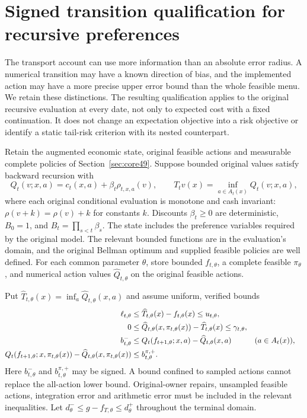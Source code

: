 \section{Signed transition qualification for recursive preferences}\label{sec:risk91}
The transport account can use more information than an absolute error radius. A numerical transition may have a known direction of bias, and the implemented action may have a more precise upper error bound than the whole feasible menu. We retain these distinctions. The resulting qualification applies to the original recursive evaluation at every date, not only to expected cost with a fixed continuation. It does not change an expectation objective into a risk objective or identify a static tail-risk criterion with its nested counterpart.

Retain the augmented economic state, original feasible actions and measurable complete policies of Section~\ref{sec:core49}. Suppose bounded original values satisfy backward recursion with
\[
 Q_t(v;x,a)=c_t(x,a)+\beta_t\rho_{t,x,a}(v),\qquad
 T_tv(x)=\inf_{a\in A_t(x)}Q_t(v;x,a),
\]
where each original conditional evaluation is monotone and cash invariant: $\rho(v+k)=\rho(v)+k$ for constants $k$. Discounts $\beta_t\ge0$ are deterministic, $B_0=1$, and $B_t=\prod_{s<t}\beta_s$. The state includes the preference variables required by the original model. The relevant bounded functions are in the evaluation's domain, and the original Bellman optimum and supplied feasible policies are well defined. For each common parameter $\theta$, store bounded $f_{t,\theta}$, a complete feasible $\pi_\theta$, and numerical action values $\widehat Q_{t,\theta}$ on the original feasible actions.

Put $\widehat T_{t,\theta}(x)=\inf_a\widehat Q_{t,\theta}(x,a)$ and assume uniform, verified bounds
\begin{align}\label{eq:signed-input91}
 \ell_{t,\theta}&\le\widehat T_{t,\theta}(x)-f_{t,\theta}(x)
                         \le u_{t,\theta},\notag\\
 0&\le\widehat Q_{t,\theta}(x,\pi_{t,\theta}(x))
                          -\widehat T_{t,\theta}(x)\le\gamma_{t,\theta},\notag\\
 b^-_{t,\theta}&\le Q_t(f_{t+1,\theta};x,a)-\widehat Q_{t,\theta}(x,a)
                              &&(a\in A_t(x)),\notag\\
 Q_t(f_{t+1,\theta};x,\pi_{t,\theta}(x))
       -\widehat Q_{t,\theta}(x,\pi_{t,\theta}(x))&\le b^{\pi,+}_{t,\theta}.
\end{align}
Here $b^-_{t,\theta}$ and $b^{\pi,+}_{t,\theta}$ may be signed. A bound confined to sampled actions cannot replace the all-action lower bound. Original-owner repairs, unsampled feasible actions, integration error and arithmetic error must be included in the relevant inequalities. Let $d^-_\theta\le g-f_{T,\theta}\le d^+_\theta$ throughout the terminal domain.

